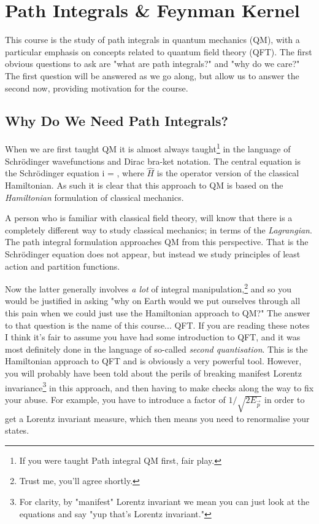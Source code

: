 \chapter{Path Integrals \& Feynman Kernel}

This course is the study of path integrals in quantum mechanics (QM), with a particular emphasis on concepts related to quantum field theory (QFT). The first obvious questions to ask are "what are path integrals?" and "why do we care?" The first question will be answered as we go along, but allow us to answer the second now, providing motivation for the course. 

\section{Why Do We Need Path Integrals?}

When we are first taught QM it is almost always taught\footnote{If you were taught Path integral QM first, fair play.} in the language of Schr\"{o}dinger wavefunctions and Dirac bra-ket notation. The central equation is the Schr\"{o}dinger equation
\bse 
    i\ket{\psi} = \ket{\psi},
\ese 
where $\hat{H}$ is the operator version of the classical Hamiltonian. As such it is clear that this approach to QM is based on the \textit{Hamiltonian} formulation of classical mechanics.

A person who is familiar with classical field theory, will know that there is a completely different way to study classical mechanics; in terms of the \textit{Lagrangian}. The path integral formulation approaches QM from this perspective. That is the Schr\"{o}dinger equation does not appear, but instead we study principles of least action and partition functions. 

Now the latter generally involves \textit{a lot} of integral manipulation,\footnote{Trust me, you'll agree shortly.} and so you would be justified in asking "why on Earth would we put ourselves through all this pain when we could just use the Hamiltonian approach to QM?" The answer to that question is the name of this course... QFT. If you are reading these notes I think it's fair to assume you have had some introduction to QFT, and it was most definitely done in the language of so-called \textit{second quantisation}. This is the Hamiltonian approach to QFT and is obviously a very powerful tool. However, you will probably have been told about the perils of breaking manifest Lorentz invariance\footnote{For clarity, by "manifest" Lorentz invariant we mean you can just look at the equations and say "yup that's Lorentz invariant."} in this approach, and then having to make checks along the way to fix your abuse. For example, you have to introduce a factor of $1/\sqrt{2E_{\Vec{p}}}$ in order to get a Lorentz invariant measure, which then means you need to renormalise your states. 

